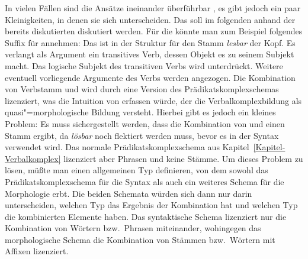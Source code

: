 In vielen Fällen sind die Ansätze ineinander überführbar \parencites[--169]{Koenig99a}[Kapitel~6.2.5.2]{Mueller2002b},
es gibt jedoch ein paar Kleinigkeiten, in denen sie sich unterscheiden. Das soll im folgenden
anhand der bereits diskutierten \bard diskutiert werden.
Für die \bard könnte man zum Beispiel folgendes Suffix für  annehmen:
\eas
{}%
\zs
Das \bars ist in der Struktur für den Stamm \emph{lesbar} der Kopf. Es verlangt als Argument ein transitives
Verb, dessen Objekt  es zu seinem Subjekt macht. Das logische Subjekt des transitiven Verbs wird unterdrückt.
Weitere eventuell vorliegende Argumente des Verbs  werden angezogen.
Die Kombination von Verbstamm und  wird durch eine Version des Prädikatskomplexschemas lizenziert,
was die Intuition von \citet{Bierwisch90a} erfassen würde, der die Verbalkomplexbildung als quasi"=morphologische
Bildung versteht. Hierbei gibt es jedoch ein kleines Problem: Es muss sichergestellt werden, dass die Kombination
von  und  einen Stamm ergibt, da \emph{lösbar} noch flektiert werden muss, bevor es in
der Syntax verwendet wird. Das normale Prädikatskomplexschema aus Kapitel~\ref{Kapitel-Verbalkomplex} lizenziert
aber Phrasen und keine Stämme. Um dieses Problem zu lösen, müßte man einen allgemeinen Typ definieren,
von dem sowohl das Prädikatskomplexschema für die Syntax als auch ein weiteres Schema für die Morphologie erbt.
Die beiden Schemata würden sich dann nur darin unterscheiden, welchen Typ das Ergebnis der Kombination hat und
welchen Typ die kombinierten Elemente haben. Das syntaktische Schema lizenziert nur die Kombination von Wörtern
bzw.\ Phrasen miteinander, wohingegen das morphologische Schema die Kombination von Stämmen bzw.\ Wörtern mit
Affixen lizenziert.


